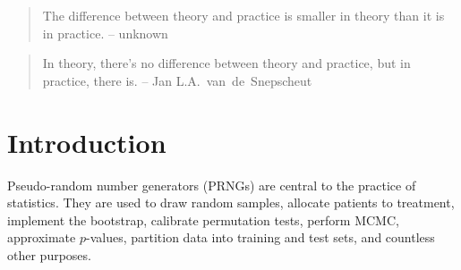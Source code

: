 \documentclass[graybox]{svmult}
\begin{document}
\begin{quotation}
The difference between theory and practice is smaller in theory than it is in practice. -- unknown
\end{quotation}


\begin{quotation}
In theory, there's no difference between theory and practice, but in practice, there is. -- Jan L.A.~van~de~Snepscheut
\end{quotation}

\section{Introduction}
\label{sec:introduction}

%
%
%

Pseudo-random number generators (PRNGs) are central to the practice of statistics.
They are used to draw random samples, allocate patients to treatment, implement the bootstrap, 
calibrate permutation tests, perform MCMC, approximate $p$-values, partition data into training and test sets, and countless other purposes.
\end{document}
